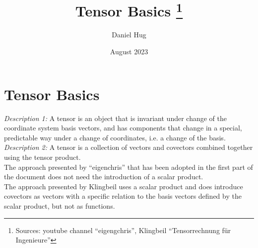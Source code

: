 \documentclass[12pt,oneside,a4paper]{article}
\title{Tensor Basics \footnote{Sources: youtube channel ``eigengchris'', Klingbeil
``Tensorrechnung für Ingenieure''}}
\author{Daniel Hug}
\date{August 2023}
\begin{document}
\maketitle


\setlength{\parindent}{0pt}

\section{Tensor Basics}

\emph{Description 1:} A tensor is an object that is invariant under change of the
coordinate system basis vectors, and has components that change in a special, predictable
way under a change of coordinates, i.e. a change of the basis. \\

\emph{Description 2:} A tensor is a collection of vectors and covectors combined together
using the tensor product.\\

The approach presented by ``eigenchris'' that has been adopted in the first part of the
document does not need the introduction of a scalar product.\\

The approach presented by Klingbeil uses a scalar product and does introduce covectors as
vectors with a specific relation to the basis vectors defined by the scalar product, but
not as functions.

\newpage








\end{document}
